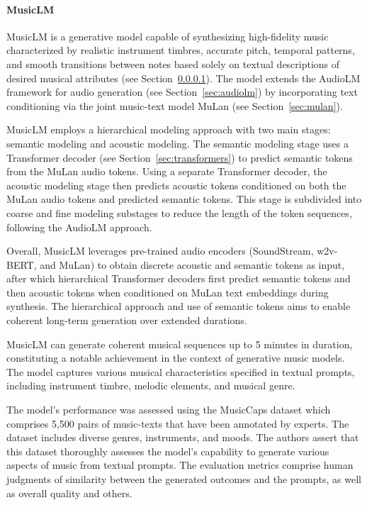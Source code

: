 \paragraph{MusicLM} \label{sec:musiclm}

MusicLM is a generative model capable of synthesizing high-fidelity music characterized by realistic instrument timbres, accurate pitch, temporal patterns, and smooth transitions between notes based solely on textual descriptions of desired musical attributes (see Section~\ref{sec:musiclm}). The model extends the AudioLM framework for audio generation (see Section~\ref{sec:audiolm}) by incorporating text conditioning via the joint music-text model MuLan (see Section~\ref{sec:mulan}).

MusicLM employs a hierarchical modeling approach with two main stages: semantic modeling and acoustic modeling. The semantic modeling stage uses a Transformer decoder (see Section~\ref{sec:transformers}) to predict semantic tokens from the MuLan audio tokens. Using a separate Transformer decoder, the acoustic modeling stage then predicts acoustic tokens conditioned on both the MuLan audio tokens and predicted semantic tokens. This stage is subdivided into coarse and fine modeling substages to reduce the length of the token sequences, following the AudioLM approach.   

Overall, MusicLM leverages pre-trained audio encoders (SoundStream, w2v-BERT, and  MuLan) to obtain discrete acoustic and semantic tokens as input, after which hierarchical Transformer decoders first predict semantic tokens and then acoustic tokens when conditioned on MuLan text embeddings during synthesis. The hierarchical approach and use of semantic tokens aims to enable coherent long-term generation over extended durations.

MusicLM can generate coherent musical sequences up to 5 minutes in duration, constituting a notable achievement in the context of generative music models. The model captures various musical characteristics specified in textual prompts, including instrument timbre, melodic elements, and musical genre.

The model's performance was assessed using the MusicCaps dataset which comprises 5,500 pairs of music-texts that have been annotated by experts. The dataset includes diverse genres, instruments, and moods. The authors assert that this dataset thoroughly assesses the model's capability to generate various aspects of music from textual prompts. The evaluation metrics comprise human judgments of similarity between the generated outcomes and the prompts, as well as overall quality and others.    

